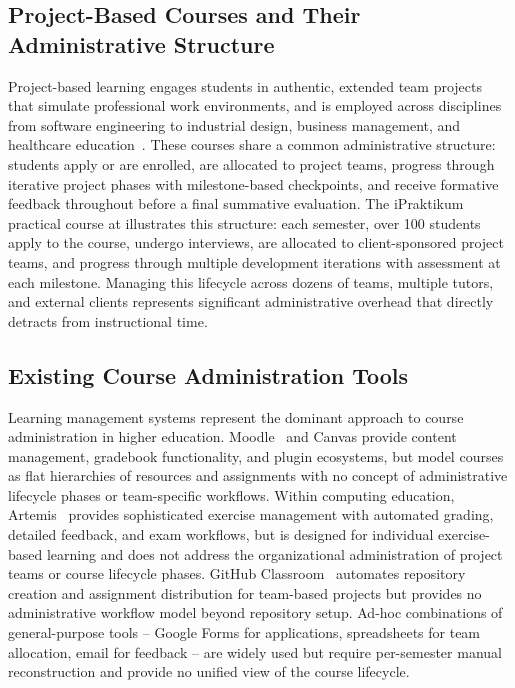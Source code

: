 
\label{sec:background}

\subsection{Project-Based Courses and Their Administrative Structure}

Project-based learning engages students in authentic, extended team projects that simulate professional work environments, and is employed across disciplines from software engineering to industrial design, business management, and healthcare education~\cite{pbl}.
These courses share a common administrative structure: students apply or are enrolled, are allocated to project teams, progress through iterative project phases with milestone-based checkpoints, and receive formative feedback throughout before a final summative evaluation.
The iPraktikum practical course at \university{} illustrates this structure:
each semester, over 100 students apply to the course, undergo interviews, are allocated to client-sponsored project teams, and progress through multiple development iterations with assessment at each milestone.
Managing this lifecycle across dozens of teams, multiple tutors, and external clients represents significant administrative overhead that directly detracts from instructional time.

\subsection{Existing Course Administration Tools}

Learning management systems represent the dominant approach to course administration in higher education.
Moodle~\cite{moodle} and Canvas provide content management, gradebook functionality, and plugin ecosystems, but model courses as flat hierarchies of resources and assignments with no concept of administrative lifecycle phases or team-specific workflows.
Within computing education, Artemis~\cite{artemis} provides sophisticated exercise management with automated grading, detailed feedback, and exam workflows, but is designed for individual exercise-based learning and does not address the organizational administration of project teams or course lifecycle phases.
GitHub Classroom~\cite{github-classroom} automates repository creation and assignment distribution for team-based projects but provides no administrative workflow model beyond repository setup.
Ad-hoc combinations of general-purpose tools -- Google Forms for applications, spreadsheets for team allocation, email for feedback -- are widely used but require per-semester manual reconstruction and provide no unified view of the course lifecycle.

